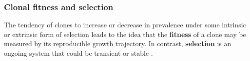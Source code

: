 


\subsubsection{Clonal fitness and selection}
The tendency of clones to increase or decrease in prevalence under some intrinsic or extrinsic form of selection leads to the idea that the \textbf{fitness} of a clone may be measured by its reproducible growth trajectory. In contrast, \textbf{selection} is an ongoing system that could be transient or stable \cite{szendro2013predictability}.

